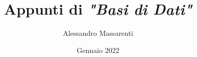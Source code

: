 \documentclass[a4paper, 10pt]{report}
\title{Appunti di \textit{"Basi di Dati"}}
\author{Alessandro Massarenti}
\date{Gennaio 2022}
\begin{document}
\maketitle

\tableofcontents











\lstlistoflistings
\end{document}
